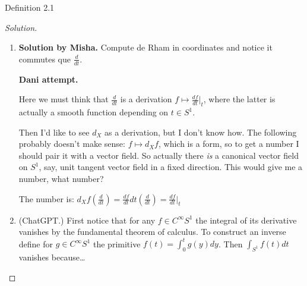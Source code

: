 \begin{thing3}{Definition 2.1}
\begin{proof}[Solution]
\begin{enumerate}
\[\begin{tikzcd}[column sep=small]
	\leavevmode\arrow[r]&H^{1}_X(M)\arrow[r]&H^{1}(X)\otimes \mathbb{R} \oplus  H^{0}(X)\otimes \mathbb{R}\arrow[r]&H^{1}(S^1)\arrow[r]&\cdots
\end{tikzcd}\]
\[\begin{tikzcd}[column sep=small]
	\leavevmode\arrow[r]&H^{2}_X(M)\arrow[r]&H^{1}(X)\otimes \mathbb{R} \oplus  H^{2}(X)\otimes \mathbb{R}\arrow[r]&0\arrow[r]&\cdots
\end{tikzcd}\]
\[\begin{tikzcd}[column sep=small]
	\leavevmode\arrow[r]&H^{3}_X(M)\arrow[r]&H^{3}(X)\otimes \mathbb{R} \oplus  H^{2}(X)\otimes \mathbb{R}\arrow[r]&0\arrow[r]&\cdots
\end{tikzcd}\]


So I wonder how to finish. Perhaps using some spectral sequence?

\iffalse if the sequence
\[\begin{tikzcd}0\arrow[r]&H^{0}_X(M)\arrow[r]&H^{0}(X)\arrow[r]&\mathbb{R}\end{tikzcd}\]
gives
\[H^{0}_X(M)\cong H^{0}(X)\otimes C^\infty S^1\]
{\color{2}Looks like not.}

\textbf{Note.} Looks like using Serre spectral sequence (adding the hypothesis that \(X\) is simply connected yields \(H^0_X(M)\cong H^0(X) \otimes H^0(S^1)\). So the question of how the smooth functions \(C^\infty S^1\) appear remains a mystery.
\fi
\item 
\textbf{Solution by Misha.} Compute de Rham in coordinates and notice it commutes que \(\frac{d}{dt}\).

\textbf{Dani attempt.} 

	Here we must think that \(\frac{d}{dt}\) is a derivation \(f \mapsto \frac{df}{dt}\Big|_{t}\), where the latter is actually a smooth function depending on \(t \in S^1\). 


	Then I'd like to see \(d_X\) as a derivation, but I don't know how. The following probably doesn't make sense: \(f \mapsto d_Xf\), which is a form, so to get a number I should pair it with a vector field. So actually there \textit{is} a canonical vector field on \(S^1\), say, unit tangent vector field in a fixed direction. This would give me a number, what number?

	The number is: \(d_Xf\left(\frac{d}{dt}\right) =\frac{d f}{d t}dt\left(\frac{d}{dt}\right) =\frac{df}{dt}\Big|_{t}\)

\item (ChatGPT.) First notice that for any \(f \in C^\infty S^1\) the integral of its derivative vanishes by the fundamental theorem of calculus. To construct an inverse define for \(g \in C^\infty S^1\) the primitive \(f(t)=\int_{0}^tg(y)dy\). Then \(\int_{S^1}f(t)dt\) {\color{4}vanishes because…}



\end{enumerate}
\end{proof}
\end{thing3}
